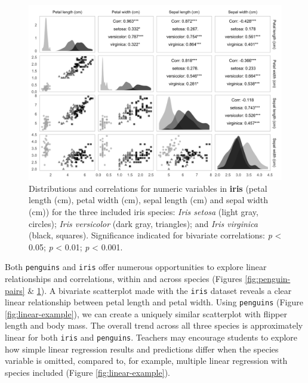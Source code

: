 \begin{Schunk}
\begin{figure}

{\centering \includegraphics[width=\textwidth]{figs/iris-pairs-1} 

}

\caption{Distributions and correlations for numeric variables in \textbf{iris} (petal length (cm), petal width (cm), sepal length (cm) and sepal width (cm)) for the three included iris species: \textit{Iris setosa} (light gray, circles); \textit{Iris versicolor} (dark gray, triangles); and \textit{Iris virginica} (black, squares). Significance indicated for bivariate correlations: \text{*}\textit{p} < 0.05; \text{*}\text{*}\textit{p} < 0.01; \text{*}\text{*}\text{*}\textit{p} < 0.001.}\label{fig:iris-pairs}
\end{figure}
\end{Schunk}

Both \texttt{penguins} and \texttt{iris} offer numerous opportunities to
explore linear relationships and correlations, within and across species
(Figures \ref{fig:penguin-pairs} \& \ref{fig:iris-pairs}). A bivariate
scatterplot made with the \texttt{iris} dataset reveals a clear linear
relationship between petal length and petal width. Using
\texttt{penguins} (Figure \ref{fig:linear-example}), we can create a
uniquely similar scatterplot with flipper length and body mass. The
overall trend across all three species is approximately linear for both
\texttt{iris} and \texttt{penguins}. Teachers may encourage students to
explore how simple linear regression results and predictions differ when
the species variable is omitted, compared to, for example, multiple
linear regression with species included (Figure
\ref{fig:linear-example}).

